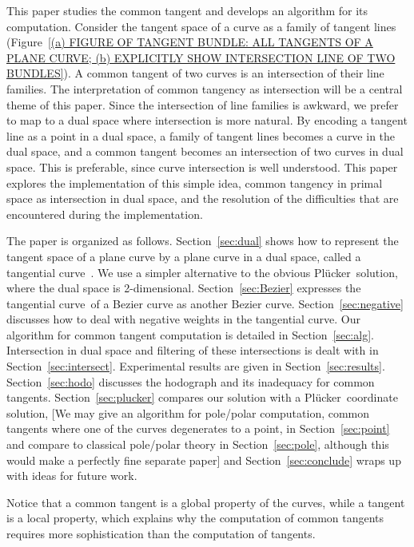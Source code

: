 \documentclass[11pt]{article}
\newcommand{\plucker}{Pl\"{u}cker\ }
\newcommand{\tang}{tangential curve\ }
\begin{document}
This paper studies the common tangent and develops an algorithm for its
computation.
Consider the tangent space of a curve as a family of tangent lines
(Figure~\ref{(a) FIGURE OF TANGENT BUNDLE: ALL TANGENTS OF A PLANE CURVE;
(b) EXPLICITLY SHOW INTERSECTION LINE OF TWO BUNDLES}).
A common tangent of two curves is an intersection of their line families.
The interpretation of common tangency as intersection
will be a central theme of this paper.
Since the intersection of line families is awkward,
we prefer to map to a dual space where intersection is more natural.
By encoding a tangent line as a point in a dual space,
a family of tangent lines becomes a curve in the dual space,
and a common tangent becomes an intersection of two curves in dual space.
This is preferable, since curve intersection is well understood.
This paper explores the implementation of this simple idea,
common tangency in primal space as intersection in dual space,
and the resolution of the difficulties that are encountered during the
implementation.

The paper is organized as follows.
Section~\ref{sec:dual} shows how to represent the tangent space of a plane curve
by a plane curve in a dual space, called a \tang.
We use a simpler alternative to the obvious \plucker solution,
where the dual space is 2-dimensional.
Section~\ref{sec:Bezier} expresses the \tang of a Bezier curve as another Bezier curve.
Section~\ref{sec:negative} discusses how to deal with negative weights in the 
tangential curve.
Our algorithm for common tangent computation is detailed in Section~\ref{sec:alg}.
Intersection in dual space and filtering of these intersections
is dealt with in Section~\ref{sec:intersect}.
Experimental results are given in Section~\ref{sec:results}.
Section~\ref{sec:hodo} discusses the hodograph and its inadequacy
for common tangents.
Section~\ref{sec:plucker} compares our solution with a \plucker coordinate solution,
[We may give an algorithm for pole/polar computation, common tangents
where one of the curves degenerates to a point, in Section~\ref{sec:point}
and compare to classical pole/polar theory in Section~\ref{sec:pole},
although this would make a perfectly fine separate paper]
and Section~\ref{sec:conclude} wraps up with ideas for future work.

\begin{rmk}
Notice that a common tangent is a global property of the curves,
while a tangent is a local property,
which explains why the computation of common tangents requires more 
sophistication than the computation of tangents.
\end{rmk}
\end{document}

